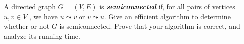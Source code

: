A directed graph $G = (V,E)$ is \textit{\textbf{semiconnected}} if, 
for all pairs of vertices $u,v \in V$ , we have $u \leadsto v$ or $v \leadsto u$. 
Give an efficient algorithm to determine whether or not $G$ is 
semiconnected. Prove that your algorithm is correct, and analyze 
its running time.
